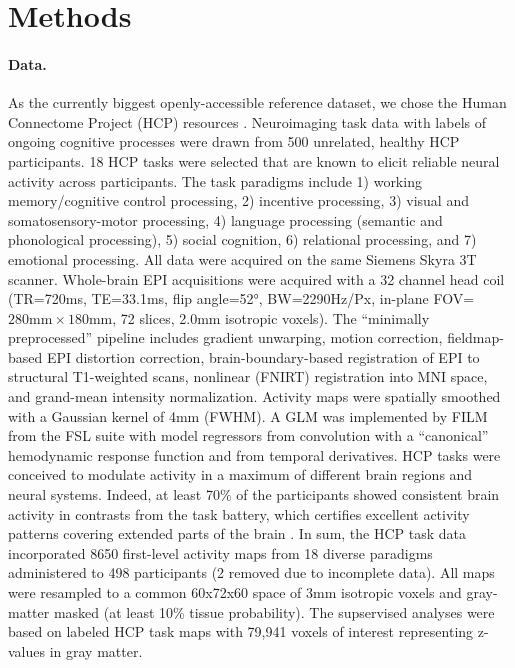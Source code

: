 \documentclass{article} %
\begin{document}
\section{Methods}
%
\paragraph{Data.}
As the currently biggest openly-accessible reference dataset,
we chose the Human Connectome Project (HCP) resources
\cite{barch2013}.
Neuroimaging task data with labels of ongoing cognitive processes
were drawn from 500 unrelated,
healthy HCP participants.
18 HCP tasks 
were selected that are known to elicit reliable neural activity
across participants.
The task paradigms include
1) working memory/cognitive control processing, 2)
incentive processing, 3) visual and somatosensory-motor processing,
4) language processing (semantic and phonological processing),
5) social cognition, 6) relational processing, and 7) emotional
processing. All data were acquired on the same Siemens Skyra 3T scanner.
Whole-brain EPI acquisitions were acquired with a
32 channel head coil (TR=720ms, TE=33.1ms, flip angle=52°, BW=2290Hz/Px,
in-plane FOV=$280\textrm{mm}\times180\textrm{mm}$, 72 slices, 2.0mm 
isotropic voxels).
The ``minimally preprocessed'' pipeline includes
gradient unwarping, motion correction, fieldmap-based EPI distortion
correction, brain-boundary-based registration of EPI to structural
T1-weighted scans, nonlinear (FNIRT) registration into MNI space,
and grand-mean intensity normalization. Activity maps were spatially
smoothed with a Gaussian kernel of 4mm (FWHM). A GLM was
implemented by FILM from the FSL suite with model regressors from convolution
with a “canonical” hemodynamic response function and from temporal derivatives.
HCP tasks were conceived to modulate activity
in a maximum of different brain regions and neural systems. Indeed, at
least 70\% of the participants showed consistent brain activity in
contrasts from the task battery, which certifies excellent
activity patterns covering extended parts of the brain \cite{barch2013}.
%
In sum, the HCP task data incorporated 8650 first-level activity maps
from 18 diverse paradigms administered to 498 participants (2 removed
due to incomplete data).
All maps were resampled to a common 60x72x60 space of
3mm isotropic voxels and gray-matter masked (at least 10\% tissue
probability).
The supservised analyses were based on labeled HCP task maps with
79,941 voxels of interest representing z-values in gray matter.
\end{document}
